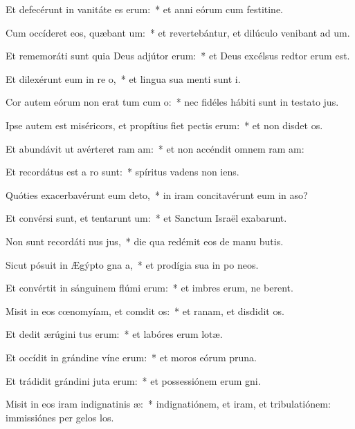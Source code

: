 \item Et defecérunt in vanitáte es erum:~* et anni eórum cum festitine.
\item Cum occíderet eos, quæbant um:~* et revertebántur, et dilúculo venibant ad um.
\item Et rememoráti sunt quia Deus adjútor  erum:~* et Deus excélsus redtor erum est.
\item Et dilexérunt eum in re o,~* et lingua sua menti sunt i.
\item Cor autem eórum non erat tum cum o:~* nec fidéles hábiti sunt in testato jus.
\item Ipse autem est miséricors, et propítius fiet pectis erum:~* et non disdet os.
\item Et abundávit ut avérteret ram am:~* et non accéndit omnem ram am:
\item Et recordátus est a ro sunt:~* spíritus vadens  non iens.
\item Quóties exacerbavérunt eum  deto,~* in iram concitavérunt eum in aso?
\item Et convérsi sunt, et tentarunt um:~* et Sanctum Israël exabarunt.
\item Non sunt recordáti nus jus,~* die qua redémit eos de manu butis.
\item Sicut pósuit in Ægýpto gna a,~* et prodígia sua in po neos.
\item Et convértit in sánguinem flúmi erum:~* et imbres erum, ne berent.
\item Misit in eos cœnomyíam, et comdit os:~* et ranam, et disdidit os.
\item Et dedit ærúgini tus erum:~* et labóres erum lotæ.
\item Et occídit in grándine víne erum:~* et moros eórum  pruna.
\item Et trádidit grándini juta erum:~* et possessiónem erum gni.
\item Misit in eos iram indignatinis æ:~* indignatiónem, et iram, et tribulatiónem: immissiónes per gelos los.
